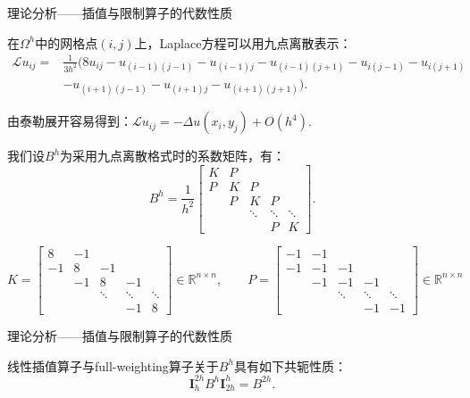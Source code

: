 \documentclass[9pt]{beamer}
\begin{document}
\begin{frame}{理论分析——插值与限制算子的代数性质}
\small
\begin{lemma}
  \small
  在$\Omega^h$中的网格点$(i,j)$上，Laplace方程可以用九点离散表示：
  \begin{align}
    \mathcal{L} u_{ij} =& \frac{1}{3h^2}(8u_{ij}-u_{(i-1)(j-1)}-u_{(i-1)j}-u_{(i-1)(j+1)}-u_{i(j-1)}-u_{i(j+1)} \nonumber \\
    &-u_{(i+1)(j-1)}-u_{(i+1)j}-u_{(i+1)(j+1)}).
  \end{align}

  由泰勒展开容易得到：$\mathcal{L} u_{ij}=-\Delta u(x_i,y_j)+O(h^4).$
\end{lemma}

我们设$B^h$为采用九点离散格式时的系数矩阵，有：
\begin{equation}
  B^h=\frac{1}{h^2}\begin{bmatrix}
    K & P & \\
    P & K & P & \\
    & P & K & P &\\
    & & \ddots & \ddots & \ddots\\
    & & & P & K
  \end{bmatrix}.
\end{equation}

\begin{equation*}
  K=\begin{bmatrix}
    8 & -1 & \\
    -1 & 8 & -1 & \\
    & -1 & 8 & -1 &\\
    & & \ddots & \ddots & \ddots\\
    & & & -1 & 8
  \end{bmatrix}\in\mathbb{R}^{n\times n}, \qquad 
  P=\begin{bmatrix}
    -1 & -1 & \\
    -1 & -1 & -1 & \\
    & -1 & -1 & -1 &\\
    & & \ddots & \ddots & \ddots\\
    & & & -1 & -1
  \end{bmatrix}\in\mathbb{R}^{n\times n}
\end{equation*}
\end{frame}

\begin{frame}{理论分析——插值与限制算子的代数性质}
  \small
  \begin{lemma}
    线性插值算子与full-weighting算子关于$B^h$具有如下共轭性质：
    \begin{equation}
      \mathbf{I}_h^{2h}B^h\mathbf{I}_{2h}^h=B^{2h}.
    \end{equation}
  \end{lemma}
\end{frame}
\end{document}
